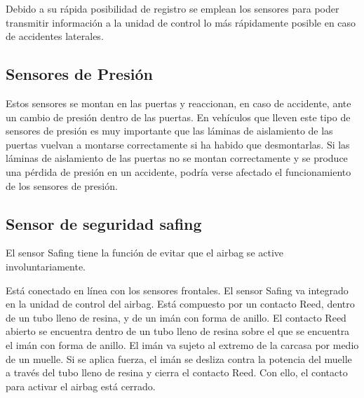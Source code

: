 Debido a su rápida posibilidad de registro se emplean los sensores para poder transmitir información a la unidad de control lo más rápidamente posible en caso de accidentes laterales.

\subsection{Sensores de Presión}


Estos sensores se montan en las puertas y reaccionan, en caso de accidente, ante un cambio de presión dentro de las puertas. En vehículos que lleven este tipo de sensores de presión es muy importante que las láminas de aislamiento de las puertas vuelvan a montarse correctamente si ha habido que desmontarlas. Si las láminas de aislamiento de las puertas no se montan correctamente y se produce una pérdida de presión en un accidente, podría verse afectado el funcionamiento de los sensores de presión.
\subsection{Sensor de seguridad safing}


El sensor Safing tiene la función de evitar que el airbag se active involuntariamente.

Está conectado en línea con los sensores frontales. El sensor Safing va integrado en la unidad de control del airbag. Está compuesto por un contacto Reed, dentro de un tubo lleno de resina, y de un imán con forma de anillo. El contacto Reed abierto se encuentra dentro de un tubo lleno de resina sobre el que se encuentra el imán con forma de anillo. El imán va sujeto al extremo de la carcasa por medio de un muelle. Si se aplica fuerza, el imán se desliza contra la potencia del muelle a través del tubo lleno de resina y cierra el contacto Reed. Con ello, el contacto para activar el airbag está cerrado.







